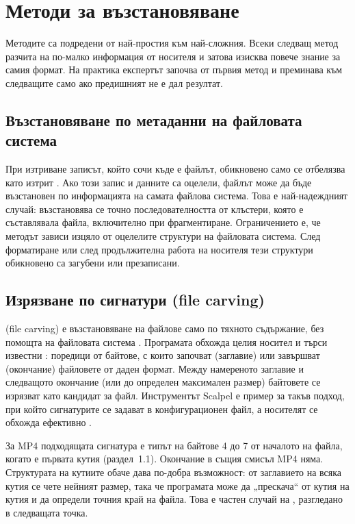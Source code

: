\section{Методи за възстановяване}

Методите са подредени от най-простия към най-сложния. Всеки следващ метод разчита на
по-малко информация от носителя и затова изисква повече знание за самия формат. На
практика експертът започва от първия метод и преминава към следващите само ако
предишният не е дал резултат.

\subsection{Възстановяване по метаданни на файловата система}

При изтриване записът, който сочи къде е файлът, обикновено само се отбелязва като
изтрит \cite{nist80086}. Ако този запис и данните са оцелели, файлът може да бъде
възстановен по информацията на самата файлова система. Това е
най-надеждният случай: възстановява се точно последователността от клъстери, която е
съставлявала файла, включително при фрагментиране. Ограничението е, че методът зависи
изцяло от оцелелите структури на файловата система. След форматиране или след
продължителна работа на носителя тези структури обикновено са загубени или
презаписани.

\subsection{Изрязване по сигнатури (file carving)}

 (file carving) е възстановяване на файлове само по тяхното
съдържание, без помощта на файловата система \cite{pal2009}. Програмата обхожда целия
носител и търси известни : поредици от байтове, с които започват
(заглавие) или завършват (окончание) файловете от даден формат. Между намереното
заглавие и следващото окончание (или до определен максимален размер) байтовете се
изрязват като кандидат за файл. Инструментът Scalpel е пример за такъв подход, при който
сигнатурите се задават в конфигурационен файл, а носителят се обхожда ефективно
\cite{richard2005scalpel}.

За MP4 подходящата сигнатура е типът  на байтове 4 до 7 от началото на файла,
когато  е първата кутия (раздел~1.1). Окончание в същия смисъл MP4 няма. Структурата на кутиите обаче дава
по-добра възможност: от заглавието на всяка кутия се чете нейният размер, така че
програмата може да „прескача“ от кутия на кутия и да определи точния край на файла.
Това е частен случай на , разгледано в следващата точка.


